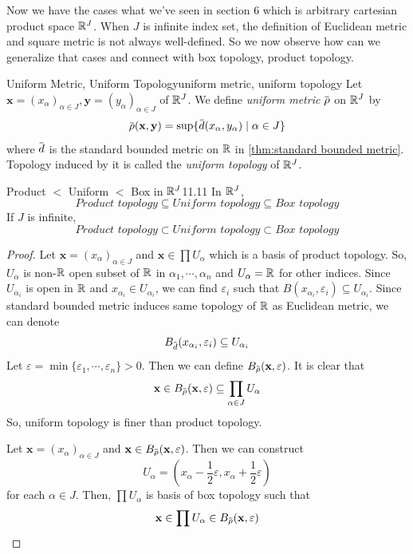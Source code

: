 \documentclass[12pt, a4paper, twoside]{article}
\newcommand{\overbar}[1]{\mkern 1.5mu\overline{\mkern-1.5mu#1\mkern-1.5mu}\mkern 1.5mu}
\theoremstyle{plain}
\begin{document}
Now we have the cases what we've seen in section 6 which is arbitrary cartesian product space ${\mathbb {R}}^J$. 
When $J$ is infinite index set, the definition of Euclidean metric and square metric is not always well-defined. 
So we now observe how can we generalize that cases and connect with box topology, product topology. 

\begin{defn}{Uniform Metric, Uniform Topology}{uniform metric, uniform topology}
    Let $\mathbf{x} = (x_\alpha)_{\alpha \in J}, \mathbf{y} = (y_\alpha)_{\alpha \in J}$ of ${\mathbb {R}}^J$. 
    We define \textit{uniform metric} $\overbar{\rho}$ on ${\mathbb {R}}^J$ by 
    \[\overbar{\rho}(\mathbf{x}, \mathbf{y}) = \sup\{\overbar{d}(x_\alpha, y_\alpha) \mid \alpha \in J\}\]
    where $\overbar{d}$ is the standard bounded metric on ${\mathbb {R}}$ in \ref{thm:standard bounded metric}. 
    Topology induced by it is called the \textit{uniform topology} of ${\mathbb {R}}^J$. 
\end{defn}

\begin{thm}{Product $<$ Uniform $<$ Box in ${\mathbb {R}}^J$}{11.11}
    In ${\mathbb {R}}^J$, 
    \[\textit{Product topology} \subseteq \textit{Uniform topology} \subseteq \textit{Box topology}\]
    If $J$ is infinite, 
    \[\textit{Product topology} \subset \textit{Uniform topology} \subset \textit{Box topology}\]
\end{thm}

\begin{proof}
    Let $\mathbf{x} = (x_\alpha)_{\alpha \in J}$ and $\mathbf{x} \in \prod U_\alpha$ which is a basis of product topology. 
    So, $U_\alpha$ is non-${\mathbb {R}}$ open subset of ${\mathbb {R}}$ in $\alpha_1, \cdots, \alpha_n$ and $U_\alpha = {\mathbb {R}}$ for other indices. 
    Since $U_{\alpha_i}$ is open in ${\mathbb {R}}$ and $x_{\alpha_i} \in U_{\alpha_i}$, 
    we can find $\varepsilon_i$ such that $B(x_{\alpha_i}, \varepsilon_i) \subseteq U_{\alpha_i}$. 
    Since standard bounded metric induces same topology of ${\mathbb {R}}$ as Euclidean metric, we can denote 
    \[B_{\overbar{d}}(x_{\alpha_i}, \varepsilon_i) \subseteq U_{\alpha_i}\]
    Let $\varepsilon = \min\{\varepsilon_1, \cdots, \varepsilon_n\} > 0$. 
    Then we can define $B_{\overbar{\rho}}(\mathbf{x}, \varepsilon)$. It is clear that 
    \[\mathbf{x} \in B_{\overbar{\rho}}(\mathbf{x}, \varepsilon) \subseteq \prod_{\alpha \in J} U_\alpha\]
    So, uniform topology is finer than product topology. 

    Let $\mathbf{x} = (x_\alpha)_{\alpha \in J}$ and $\mathbf{x} \in B_{\overbar{\rho}}(\mathbf{x}, \varepsilon)$. 
    Then we can construct 
    \[U_\alpha = \left(x_\alpha - \frac{1}{2}\varepsilon, x_\alpha + \frac{1}{2}\varepsilon \right)\]
    for each $\alpha \in J$. Then, $\prod U_\alpha$ is basis of box topology such that 
    \[\mathbf{x} \in \prod U_\alpha \in B_{\overbar{\rho}}(\mathbf{x}, \varepsilon)\]
\end{proof}
\end{document}
